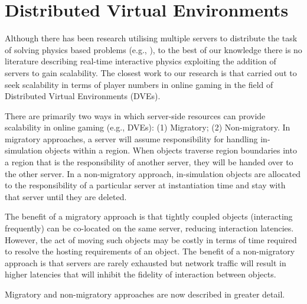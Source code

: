 \section{Distributed Virtual Environments}

Although there has been research utilising multiple servers to distribute the task of solving physics based problems (e.g., \cite{mashayekhi2018automatically}), to the best of our knowledge there is no literature describing real-time interactive physics exploiting the addition of servers to gain scalability. The closest work to our research is that carried out to seek scalability in terms of player numbers in online gaming in the field of Distributed Virtual Environments (DVEs). 

There are primarily two ways in which server-side resources can provide scalability in online gaming (e.g., DVEs): (1) Migratory; (2) Non-migratory. In migratory approaches, a server will assume responsibility for handling in-simulation objects within a region. When objects traverse region boundaries into a region that is the responsibility of another server, they will be handed over to the other server. In a non-migratory approach, in-simulation objects are allocated to the responsibility of a particular server at instantiation time and stay with that server until they are deleted.

The benefit of a migratory approach is that tightly coupled objects (interacting frequently) can be co-located on the same server, reducing interaction latencies. However, the act of moving such objects may be costly in terms of time required to resolve the hosting requirements of an object. The benefit of a non-migratory approach is that servers are rarely exhausted but network traffic will result in higher latencies that will inhibit the fidelity of interaction between objects.

Migratory and non-migratory approaches are now described in greater detail.

